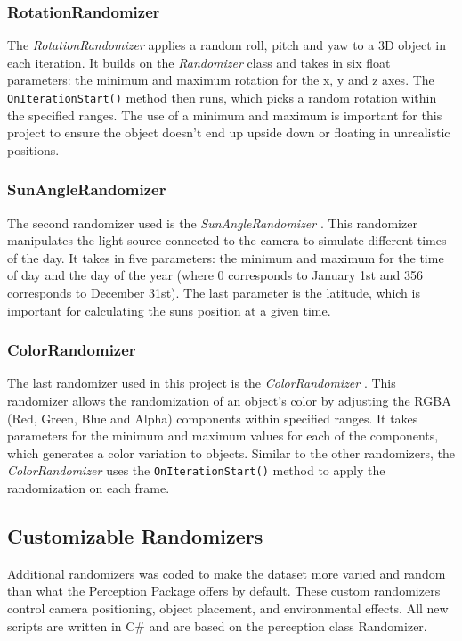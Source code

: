 \subsubsection{RotationRandomizer}
The \textit{RotationRandomizer} \cite{rotation_randomizer} applies a random roll, pitch and yaw to a 3D object in each iteration. It builds on the \textit{Randomizer} class and takes in six float parameters: the minimum and maximum rotation for the x, y and z axes. The \texttt{OnIterationStart()} method then runs, which picks a random rotation within the specified ranges. The use of a minimum and maximum is important for this project to ensure the object doesn’t end up upside down or floating in unrealistic positions.

\subsubsection{SunAngleRandomizer}
The second randomizer used is the \textit{SunAngleRandomizer} \cite{sun_angle_randomizer}. This randomizer manipulates the light source connected to the camera to simulate different times of the day. It takes in five parameters: the minimum and maximum for the time of day and the day of the year (where 0 corresponds to January 1st and 356 corresponds to December 31st). The last parameter is the latitude, which is important for calculating the suns position at a given time.

\subsubsection{ColorRandomizer}
The last randomizer used in this project is the \textit{ColorRandomizer} \cite{color_randomizer}. This randomizer allows the randomization of an object's color by adjusting the RGBA (Red, Green, Blue and Alpha) components within specified ranges. It takes parameters for the minimum and maximum values for each of the components, which generates a color variation to objects. Similar to the other randomizers, the \textit{ColorRandomizer} uses the \texttt{OnIterationStart()} method to apply the randomization on each frame.


\subsection{Customizable Randomizers}
Additional randomizers was coded to make the dataset more varied and random than what the Perception Package offers by default. These custom randomizers control camera positioning, object placement, and environmental effects. All new scripts are written in C\# and are based on the perception class Randomizer.

